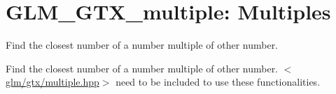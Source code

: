 \hypertarget{group__gtx__multiple}{\section{\-G\-L\-M\-\_\-\-G\-T\-X\-\_\-multiple\-: \-Multiples}
\label{group__gtx__multiple}
}


\-Find the closest number of a number multiple of other number.  


\-Find the closest number of a number multiple of other number. $<$\hyperlink{multiple_8hpp}{glm/gtx/multiple.\-hpp}$>$ need to be included to use these functionalities. 